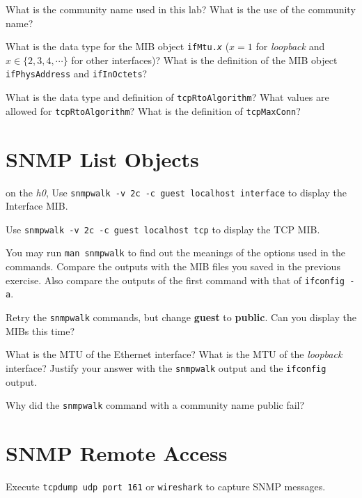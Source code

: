 \documentclass{../UTNetLab}
\begin{document}
    \begin{report}
        \item What is the community name used in this lab? What is the use of the
            community name?
        
        \item What is the data type for the MIB object \texttt{ifMtu.\textit{x}} ($x=1$ for \textit{loopback} and $x \in \{2,3,4,\cdots\}$ for other interfaces)? What is the definition of the MIB object \texttt{ifPhysAddress} and \texttt{ifInOctets}?
        
        \item What is the data type and definition of \texttt{tcpRtoAlgorithm}? What values are allowed for \texttt{tcpRtoAlgorithm}? What is the definition of \texttt{tcpMaxConn}?
    \end{report}

\section{SNMP List Objects}
    on the \textit{h0},
    Use \lstinline[emph={guest}]{snmpwalk -v 2c -c guest localhost interface} to display the Interface MIB.

    Use \lstinline[emph={guest}]{snmpwalk -v 2c -c guest localhost tcp} to display the TCP MIB.

    You may run \lstinline{man snmpwalk} to find out the meanings of the options used in the commands.
    Compare the outputs with the MIB files you saved in the previous exercise.
    Also compare the outputs of the first command with that of \lstinline{ifconfig -a}.

    Retry the \lstinline{snmpwalk} commands, but change \textbf{guest} to \textbf{public}.
    Can you display the MIBs this time?
    
    \begin{report}
        \item What is the MTU of the Ethernet interface? What is the MTU of the \textit{loopback} interface? Justify your answer with the \lstinline{snmpwalk} output and the \lstinline{ifconfig} output.
        
        \item Why did the \lstinline{snmpwalk} command with a community name public fail?
    \end{report}

\section{SNMP Remote Access}
    Execute \lstinline[morekeywords={[3]udp,port}]{tcpdump udp port 161} or \lstinline{wireshark} to capture SNMP messages.
\end{document}
